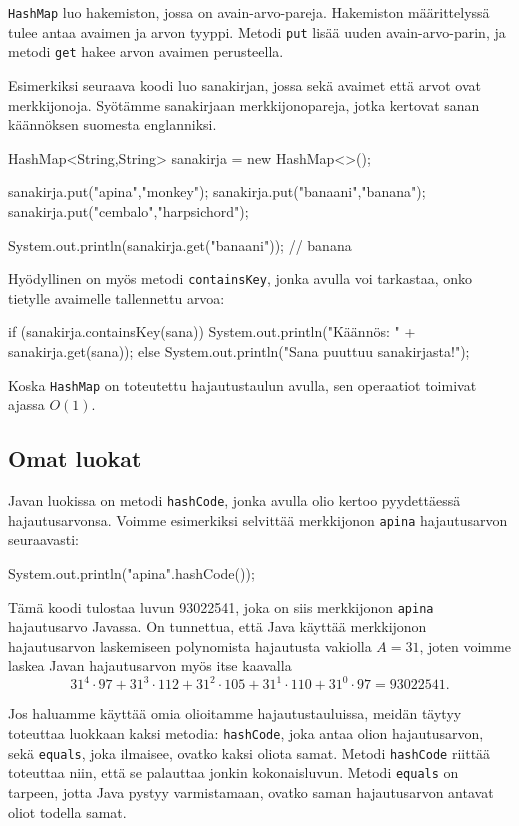 \texttt{HashMap} luo hakemiston,
jossa on avain-arvo-pareja.
Hakemiston määrit\-telyssä tulee antaa
avaimen ja arvon tyyppi.
Metodi \texttt{put} lisää uuden avain-arvo-parin,
ja metodi \texttt{get} hakee arvon avaimen perusteella.

Esimerkiksi seuraava koodi luo sanakirjan, jossa sekä
avaimet että arvot ovat merkkijonoja.
Syötämme sanakirjaan merkkijonopareja, jotka kertovat
sanan käännöksen suomesta englanniksi.

\begin{code}
HashMap<String,String> sanakirja = new HashMap<>();

sanakirja.put("apina","monkey");
sanakirja.put("banaani","banana");
sanakirja.put("cembalo","harpsichord");

System.out.println(sanakirja.get("banaani")); // banana
\end{code}

Hyödyllinen on myös metodi \texttt{containsKey},
jonka avulla voi tarkastaa, onko tietylle avaimelle
tallennettu arvoa:

\begin{code}
if (sanakirja.containsKey(sana)) {
    System.out.println("Käännös: " + sanakirja.get(sana));
} else {
    System.out.println("Sana puuttuu sanakirjasta!");
}
\end{code}

Koska \texttt{HashMap} on toteutettu hajautustaulun avulla,
sen operaatiot toimivat ajassa $O(1)$.

\subsection{Omat luokat}

Javan luokissa on metodi \texttt{hashCode},
jonka avulla olio kertoo pyydettäessä hajautusarvonsa.
Voimme esimerkiksi selvittää merkkijonon \texttt{apina}
hajautusarvon seuraavasti:

\begin{code}
System.out.println("apina".hashCode());
\end{code}

Tämä koodi tulostaa luvun 93022541,
joka on siis merkkijonon \texttt{apina} hajautusarvo Javassa.
On tunnettua, että Java käyttää merkkijonon hajautusarvon laskemiseen
polynomista hajautusta vakiolla $A=31$,
joten voimme laskea Javan hajautusarvon myös itse kaavalla
\[31^4 \cdot 97+31^3 \cdot 112+31^2 \cdot 105+31^1 \cdot 110+31^0 \cdot 97=93022541.\]

Jos haluamme käyttää omia olioitamme hajautustauluissa,
meidän täytyy toteuttaa luokkaan kaksi metodia:
\texttt{hashCode}, joka antaa olion hajautusarvon,
sekä \texttt{equals},
joka ilmaisee, ovatko kaksi oliota samat.
Metodi \texttt{hashCode} riittää toteuttaa niin,
että se palauttaa jonkin kokonaisluvun.
Metodi \texttt{equals} on tarpeen,
jotta Java pystyy varmistamaan, ovatko saman hajautusarvon
antavat oliot todella samat.

